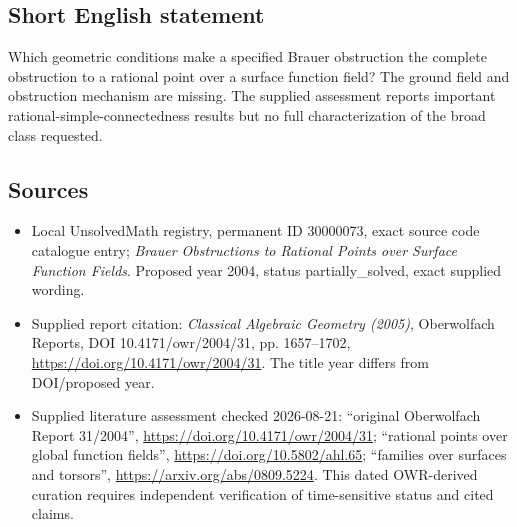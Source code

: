 \documentclass[11pt]{article}
\begin{document}
\subsection{Short English statement}
Which geometric conditions make a specified Brauer obstruction the complete obstruction to a rational point over a surface function field? The ground field and obstruction mechanism are missing. The supplied assessment reports important rational-simple-connectedness results but no full characterization of the broad class requested.
\subsection{Sources}
\begin{itemize}
\item Local UnsolvedMath registry, permanent ID 30000073, exact source code catalogue entry; \emph{Brauer Obstructions to Rational Points over Surface Function Fields}. Proposed year 2004, status partially\_solved, exact supplied wording.
\item Supplied report citation: \emph{Classical Algebraic Geometry (2005)}, Oberwolfach Reports, DOI 10.4171/owr/2004/31, pp. 1657--1702, \url{https://doi.org/10.4171/owr/2004/31}. The title year differs from DOI/proposed year.
\item Supplied literature assessment checked 2026-08-21: ``original Oberwolfach Report 31/2004'', \url{https://doi.org/10.4171/owr/2004/31}; ``rational points over global function fields'', \url{https://doi.org/10.5802/ahl.65}; ``families over surfaces and torsors'', \url{https://arxiv.org/abs/0809.5224}. This dated OWR-derived curation requires independent verification of time-sensitive status and cited claims.
\end{itemize}
\end{document}
